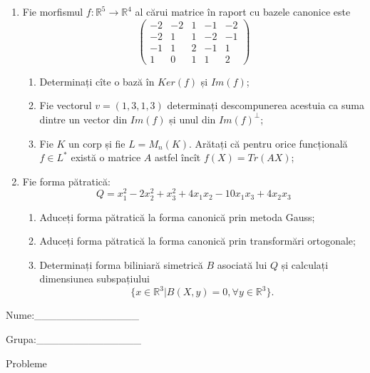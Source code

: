 \documentclass{article}
\begin{document}
\begin{enumerate}
 \item Fie morfismul $f:\mathbb{R}^5 \to \mathbb{R}^4$ al cărui matrice în raport cu bazele canonice este
$$\begin{pmatrix}
-2&-2&1&-1&-2\\
-2&1&1&-2&-1\\
-1&1&2&-1&1\\
1&0&1&1&2
\end{pmatrix}$$

\begin{enumerate}
\item Determinați cîte o bază în $Ker(f)$ și $Im(f)$;
\item Fie vectorul $v=(1,3,1,3)$ determinați descompunerea acestuia ca suma dintre un vector din $Im(f)$ și unul din $Im(f)^\perp$;
\item Fie $K$ un corp și fie $L=M_n(K)$. Arătați că pentru orice funcțională $f \in L^*$ există o matrice $A$ astfel încît $f(X)=Tr(AX)$;
\end{enumerate}
\item Fie forma pătratică:
$$Q= x_1^2-2x_2^2+x_3^2+4x_1x_2-10x_1x_3+4x_2x_3$$

\begin{enumerate}
\item Aduceți forma pătratică la forma canonică prin metoda Gauss;
\item Aduceți forma pătratică la forma canonică prin transformări ortogonale;
\item Determinați forma biliniară simetrică $B$ asociată lui $Q$ și calculați dimensiunea subspațiului
$$\{x \in \mathbb{R}^3 | B(X,y)=0,\forall y \in \mathbb{R}^3\}.$$

\end{enumerate}
\end{enumerate}
\newpage
\begin{flushright}
Nume:\_\_\_\_\_\_\_\_\_\_\_\_\_\_
 
 
Grupa:\_\_\_\_\_\_\_\_\_\_\_\_\_\_
\end{flushright}
\begin{center}
\vspace{2cm}
{\Large Probleme}
\vspace{2cm}
\end{center}
\end{document}
